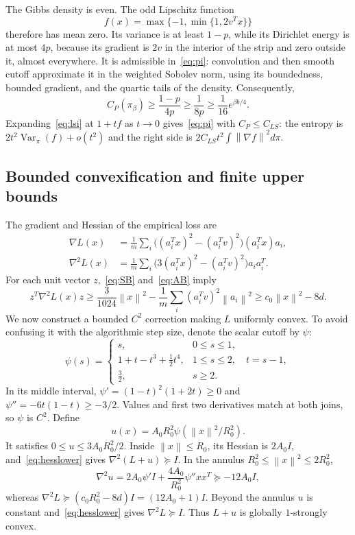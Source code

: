 \documentclass[11pt,letterpaper]{article}
\numberwithin{equation}{section}
\theoremstyle{remark}
\newcommand{\Var}{\operatorname{Var}}
\newcommand{\1}{\mathbf 1}
\newcommand{\norm}[1]{\left\lVert#1\right\rVert}
\begin{document}
The Gibbs density is even. The odd Lipschitz function
\[
 f(x)=\max\{-1,\min\{1,2v^Tx\}\}
\]
therefore has mean zero. Its variance is at least $1-p$, while its Dirichlet energy is at most $4p$, because its gradient is $2v$ in the interior of the strip and zero outside it, almost everywhere. It is admissible in~\eqref{eq:pi}: convolution and then smooth cutoff approximate it in the weighted Sobolev norm, using its boundedness, bounded gradient, and the quartic tails of the density. Consequently,
\begin{equation}\label{eq:CPproof}
 C_P(\pi_\beta)\ge\frac{1-p}{4p}
 \ge\frac1{8p}\ge\frac1{16}e^{\beta b/4}.
\end{equation}
Expanding~\eqref{eq:lsi} at $1+tf$ as $t\to0$ gives~\eqref{eq:pi} with $C_P\le C_{LS}$: the entropy is $2t^2\Var_\pi(f)+o(t^2)$ and the right side is $2C_{LS}t^2\int\norm{\nabla f}^2d\pi$.

\subsection{Bounded convexification and finite upper bounds}

The gradient and Hessian of the empirical loss are
\begin{align}
 \nabla L(x)&=\frac1m\sum_i\big((a_i^Tx)^2-(a_i^Tv)^2\big)(a_i^Tx)a_i,\label{eq:grad}\\
 \nabla^2L(x)&=\frac1m\sum_i\big(3(a_i^Tx)^2-(a_i^Tv)^2\big)a_ia_i^T.\label{eq:hess}
\end{align}
For each unit vector $z$,~\eqref{eq:SB} and~\eqref{eq:AB} imply
\begin{equation}\label{eq:hesslower}
 z^T\nabla^2L(x)z
 \ge\frac3{1024}\norm x^2-
       \frac1m\sum_i(a_i^Tv)^2\norm{a_i}^2
 \ge c_0\norm x^2-8d.
\end{equation}
We now construct a bounded $C^2$ correction making $L$ uniformly convex. To avoid confusing it with the algorithmic step size, denote the scalar cutoff by $\psi$:
\begin{equation}\label{eq:psi}
 \psi(s)=
 \begin{cases}
 s,&0\le s\le1,\\
 1+t-t^3+\tfrac12t^4,&1\le s\le2,\quad t=s-1,\\
 \tfrac32,&s\ge2.
 \end{cases}
\end{equation}
In its middle interval,
$\psi'=(1-t)^2(1+2t)\ge0$ and $\psi''=-6t(1-t)\ge-3/2$.
Values and first two derivatives match at both joins, so $\psi$ is $C^2$. Define
\begin{equation}\label{eq:u}
 u(x)=A_0R_0^2\psi(\norm x^2/R_0^2).
\end{equation}
It satisfies $0\le u\le3A_0R_0^2/2$. Inside $\norm x\le R_0$, its Hessian is $2A_0I$, and~\eqref{eq:hesslower} gives $\nabla^2(L+u)\succeq I$. In the annulus $R_0^2\le\norm x^2\le2R_0^2$,
\[
 \nabla^2u=2A_0\psi'I+
          \frac{4A_0}{R_0^2}\psi''xx^T\succeq-12A_0I,
\]
whereas
$\nabla^2L\succeq(c_0R_0^2-8d)I=(12A_0+1)I$.
Beyond the annulus $u$ is constant and~\eqref{eq:hesslower} gives $\nabla^2L\succeq I$. Thus $L+u$ is globally $1$-strongly convex.
\end{document}
